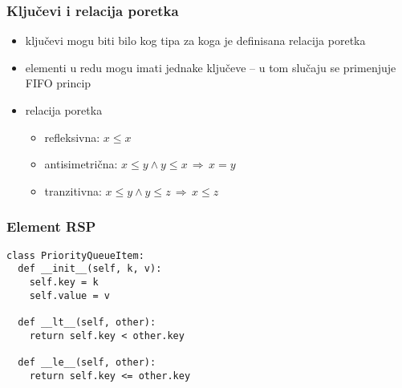 \documentclass[compress]{beamer}
\begin{document}
\begin{frame}[fragile]
  \frametitle{Ključevi i relacija poretka}
  \begin{itemize}
    \item ključevi mogu biti bilo kog tipa za koga je definisana relacija poretka
    \item elementi u redu mogu imati jednake ključeve -- u tom slučaju se primenjuje FIFO princip
    \item relacija poretka
    \begin{itemize}
      \item refleksivna: $x\leq x$
      \item antisimetrična: $x\leq y \land y\leq x \, \Rightarrow \, x = y$
      \item tranzitivna: $x\leq y \land y\leq z \, \Rightarrow \, x\leq z$
    \end{itemize}
  \end{itemize}
\end{frame}

\begin{frame}
  \frametitle{Element RSP}
\begin{verbatim}
class PriorityQueueItem:
  def __init__(self, k, v):
    self.key = k
    self.value = v
    
  def __lt__(self, other):
    return self.key < other.key
    
  def __le__(self, other):
    return self.key <= other.key
\end{verbatim}
\end{frame}
\end{document}
